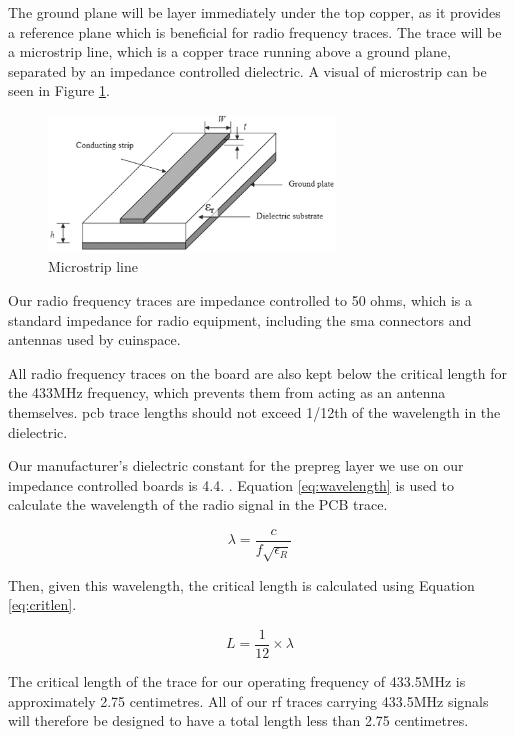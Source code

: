 The ground plane will be layer immediately under the top copper, as it provides a reference plane which is beneficial
for radio frequency traces. The trace will be a microstrip line, which is a copper trace running above a ground plane,
separated by an impedance controlled dielectric. A visual of microstrip can be seen in Figure \ref{fig:microstrip}.

\begin{figure}[H]
    \centering
    \includegraphics[width=3in]{assets/images/microstrip.png}
    \caption{Microstrip line \cite{microstrip}}
    \label{fig:microstrip}
\end{figure}

Our radio frequency traces are impedance controlled to 50 ohms, which is a standard impedance for radio equipment,
including the \gls{sma} connectors and antennas used by \gls{cuinspace}.

All radio frequency traces on the board are also kept below the critical length for the 433MHz frequency, which
prevents them from acting as an antenna themselves. \Gls{pcb} trace lengths should not exceed 1/12th of the wavelength
in the dielectric. \cite{critical-length}

Our manufacturer's dielectric constant for the prepreg layer we use on our impedance controlled boards is 4.4.
\cite{jlc-pcb-impedance}. Equation \ref{eq:wavelength} is used to calculate the wavelength of the radio signal in the
PCB trace.

\begin{equation}
    \lambda = \frac{c}{f\sqrt{\epsilon_R}}
\end{equation} \label{eq:wavelength}

Then, given this wavelength, the critical length is calculated using Equation \ref{eq:critlen}.

\begin{equation}
    L = \frac{1}{12} \times \lambda
\end{equation} \label{eq:critlen}

The critical length of the trace for our operating frequency of 433.5MHz is approximately 2.75 centimetres. All of our
\gls{rf} traces carrying 433.5MHz signals will therefore be designed to have a total length less than 2.75 centimetres.

